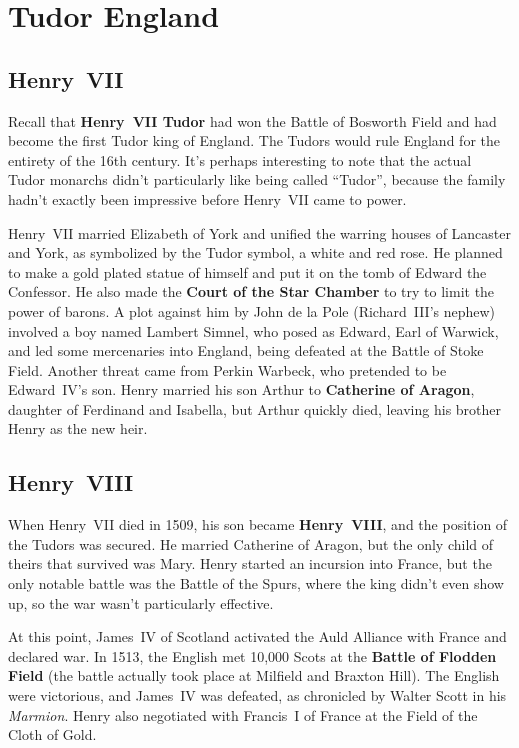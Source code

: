 \section{Tudor England}

\subsection*{Henry~VII}

Recall that \textbf{Henry~VII Tudor} had won the Battle of Bosworth Field
and had become the first Tudor king of England.
The Tudors would rule England for the entirety of the 16th century.
It's perhaps interesting to note that the actual Tudor monarchs didn't particularly like being called ``Tudor'',
because the family hadn't exactly been impressive before Henry~VII came to power.

Henry~VII married Elizabeth of York and unified the warring houses of Lancaster and York,
as symbolized by the Tudor symbol, a white and red rose.
He planned to make a gold plated statue of himself and put it on the tomb of Edward the Confessor.
He also made the \textbf{Court of the Star Chamber} to try to limit the power of barons.
A plot against him by John de la Pole (Richard~III's nephew) involved a boy named Lambert Simnel,
who posed as Edward, Earl of Warwick,
and led some mercenaries into England, being defeated at the Battle of Stoke Field.
Another threat came from Perkin Warbeck, who pretended to be Edward~IV's son.
Henry married his son Arthur to \textbf{Catherine of Aragon}, daughter of Ferdinand and Isabella,
but Arthur quickly died, leaving his brother Henry as the new heir.

\subsection*{Henry~VIII}

When Henry~VII died in 1509, his son became \textbf{Henry~VIII}, and the position of the Tudors was secured.
He married Catherine of Aragon, but the only child of theirs that survived was Mary.
Henry started an incursion into France, but the only notable battle was the Battle of the Spurs,
where the king didn't even show up, so the war wasn't particularly effective.

At this point, James~IV of Scotland activated the Auld Alliance with France and declared war.
In 1513, the English met 10,000 Scots at the \textbf{Battle of Flodden Field}
(the battle actually took place at Milfield and Braxton Hill).
The English were victorious, and James~IV was defeated, as chronicled by Walter Scott in his \textit{Marmion}.
Henry also negotiated with Francis~I of France at the Field of the Cloth of Gold.

